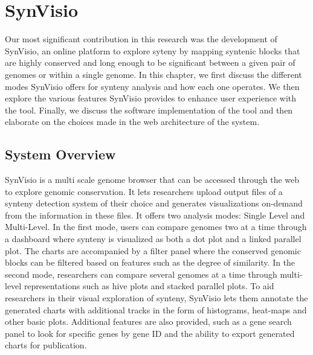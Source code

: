 \chapter{SynVisio}

Our most significant contribution in this research was the development of SynVisio, an online platform to explore syteny by mapping syntenic blocks that are highly conserved and long enough to be significant between a given pair of genomes or within a single genome. In this chapter, we first discuss the different modes SynVisio offers for synteny analysis and how each one operates. We then explore the various features SynVisio provides to enhance user experience with the tool. Finally, we discuss the software implementation of the tool and then elaborate on the choices made in the web architecture of the system.

\section{System Overview}
SynVisio is a multi scale genome browser that can be accessed through the web to explore genomic conservation. It lets researchers upload output files of a synteny detection system of their choice and generates visualizations on-demand from the information in these files. It offers two analysis modes: Single Level and Multi-Level. In the first mode, users can compare genomes two at a time through a dashboard where synteny is visualized as both a dot plot and a linked parallel plot. The charts are accompanied by a filter panel where the conserved genomic blocks can be filtered based on features such as the degree of similarity. In the second mode, researchers can compare several genomes at a time through multi-level representations such as hive plots and stacked parallel plots. To aid researchers in their visual exploration of synteny, SynVisio lets them annotate the generated charts with additional tracks in the form of histograms, heat-maps and other basic plots. Additional features are also provided, such as a gene search panel to look for specific genes by gene ID and the ability to export generated charts for publication.



